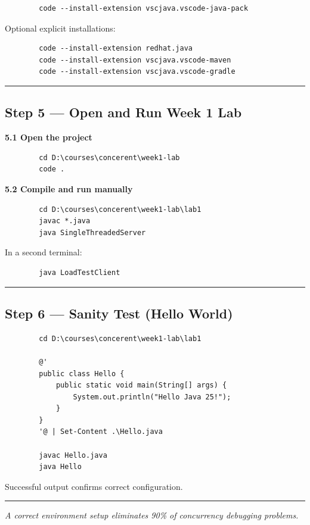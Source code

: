 \documentclass[11pt,a4paper]{article}
\begin{document}
	\begin{lstlisting}
		code --install-extension vscjava.vscode-java-pack
	\end{lstlisting}
	
	Optional explicit installations:
	
	\begin{lstlisting}
		code --install-extension redhat.java
		code --install-extension vscjava.vscode-maven
		code --install-extension vscjava.vscode-gradle
	\end{lstlisting}
	
	\vspace{6pt}
	\hrule
	\vspace{10pt}
	
	\subsection*{Step 5 — Open and Run Week 1 Lab}
	
	\textbf{5.1 Open the project}
	
	\begin{lstlisting}
		cd D:\courses\concerent\week1-lab
		code .
	\end{lstlisting}
	
	\vspace{4pt}
	
	\textbf{5.2 Compile and run manually}
	
	\begin{lstlisting}
		cd D:\courses\concerent\week1-lab\lab1
		javac *.java
		java SingleThreadedServer
	\end{lstlisting}
	
	In a second terminal:
	
	\begin{lstlisting}
		java LoadTestClient
	\end{lstlisting}
	
	\vspace{6pt}
	\hrule
	\vspace{10pt}
	
	\subsection*{Step 6 — Sanity Test (Hello World)}
	
	\begin{lstlisting}
		cd D:\courses\concerent\week1-lab\lab1
		
		@'
		public class Hello {
			public static void main(String[] args) {
				System.out.println("Hello Java 25!");
			}
		}
		'@ | Set-Content .\Hello.java
		
		javac Hello.java
		java Hello
	\end{lstlisting}
	
	Successful output confirms correct configuration.
	
	\vspace{6pt}
	\hrule
	\vspace{6pt}
	
	\begin{center}
		\textit{A correct environment setup eliminates 90\% of concurrency debugging problems.}
	\end{center}
\end{document}
